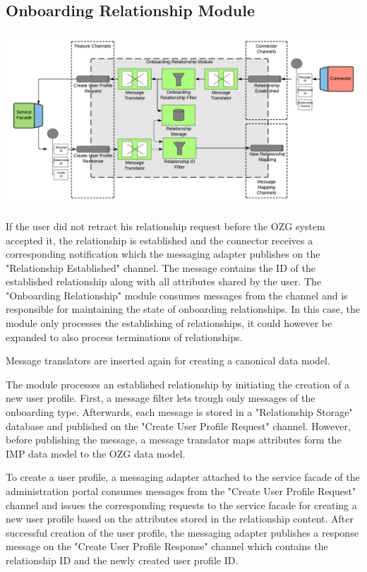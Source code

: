 \subsection{Onboarding Relationship Module}

\begin{center}
    \includegraphics[scale=0.6]{Diagrams/Integration Architecture 1/Technological Integration/8. Onboarding Relationship Module.pdf}
\end{center}

If the user did not retract his relationship request before the OZG system accepted it, the relationship is established and the connector receives a corresponding notification which the messaging adapter publishes on the "Relationship Established" channel. The message contains the ID of the established relationship along with all attributes shared by the user. The "Onboarding Relationship" module consumes messages from the channel and is responsible for maintaining the state of onboarding relationships. In this case, the module only processes the establishing of relationships, it could however be expanded to also process terminations of relationships.

Message translators are inserted again for creating a canonical data model.

The module processes an established relationship by initiating the creation of a new user profile. First, a message filter lets trough only messages of the onboarding type. Afterwards, each message is stored in a "Relationship Storage" database and published on the "Create User Profile Request" channel. However, before publishing the message, a message translator maps attributes form the IMP data model to the OZG data model.

To create a user profile, a messaging adapter attached to the service facade of the administration portal consumes messages from the "Create User Profile Request" channel and issues the corresponding requests to the service facade for creating a new user profile based on the attributes stored in the relationship content. After successful creation of the user profile, the messaging adapter publishes a response message on the "Create User Profile Response" channel which contains the relationship ID and the newly created user profile ID.

